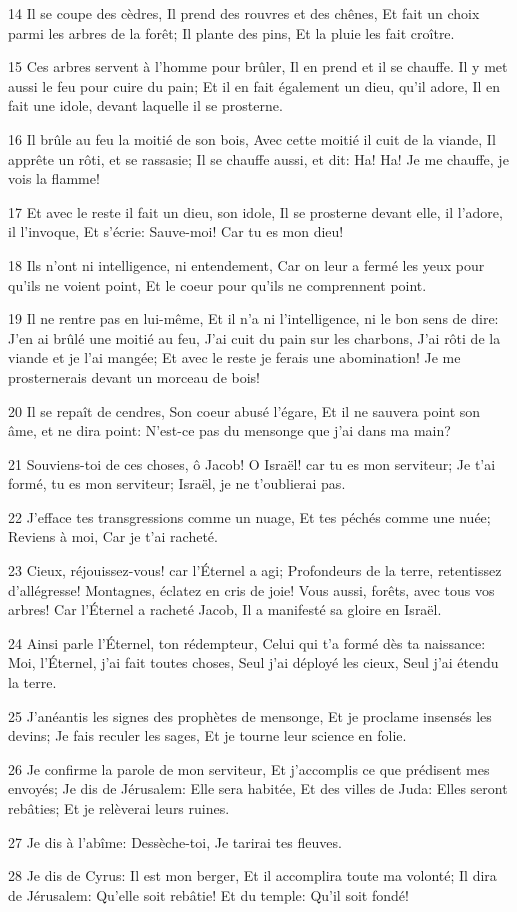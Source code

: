 \par 14 Il se coupe des cèdres, Il prend des rouvres et des chênes, Et fait un choix parmi les arbres de la forêt; Il plante des pins, Et la pluie les fait croître.
\par 15 Ces arbres servent à l'homme pour brûler, Il en prend et il se chauffe. Il y met aussi le feu pour cuire du pain; Et il en fait également un dieu, qu'il adore, Il en fait une idole, devant laquelle il se prosterne.
\par 16 Il brûle au feu la moitié de son bois, Avec cette moitié il cuit de la viande, Il apprête un rôti, et se rassasie; Il se chauffe aussi, et dit: Ha! Ha! Je me chauffe, je vois la flamme!
\par 17 Et avec le reste il fait un dieu, son idole, Il se prosterne devant elle, il l'adore, il l'invoque, Et s'écrie: Sauve-moi! Car tu es mon dieu!
\par 18 Ils n'ont ni intelligence, ni entendement, Car on leur a fermé les yeux pour qu'ils ne voient point, Et le coeur pour qu'ils ne comprennent point.
\par 19 Il ne rentre pas en lui-même, Et il n'a ni l'intelligence, ni le bon sens de dire: J'en ai brûlé une moitié au feu, J'ai cuit du pain sur les charbons, J'ai rôti de la viande et je l'ai mangée; Et avec le reste je ferais une abomination! Je me prosternerais devant un morceau de bois!
\par 20 Il se repaît de cendres, Son coeur abusé l'égare, Et il ne sauvera point son âme, et ne dira point: N'est-ce pas du mensonge que j'ai dans ma main?
\par 21 Souviens-toi de ces choses, ô Jacob! O Israël! car tu es mon serviteur; Je t'ai formé, tu es mon serviteur; Israël, je ne t'oublierai pas.
\par 22 J'efface tes transgressions comme un nuage, Et tes péchés comme une nuée; Reviens à moi, Car je t'ai racheté.
\par 23 Cieux, réjouissez-vous! car l'Éternel a agi; Profondeurs de la terre, retentissez d'allégresse! Montagnes, éclatez en cris de joie! Vous aussi, forêts, avec tous vos arbres! Car l'Éternel a racheté Jacob, Il a manifesté sa gloire en Israël.
\par 24 Ainsi parle l'Éternel, ton rédempteur, Celui qui t'a formé dès ta naissance: Moi, l'Éternel, j'ai fait toutes choses, Seul j'ai déployé les cieux, Seul j'ai étendu la terre.
\par 25 J'anéantis les signes des prophètes de mensonge, Et je proclame insensés les devins; Je fais reculer les sages, Et je tourne leur science en folie.
\par 26 Je confirme la parole de mon serviteur, Et j'accomplis ce que prédisent mes envoyés; Je dis de Jérusalem: Elle sera habitée, Et des villes de Juda: Elles seront rebâties; Et je relèverai leurs ruines.
\par 27 Je dis à l'abîme: Dessèche-toi, Je tarirai tes fleuves.
\par 28 Je dis de Cyrus: Il est mon berger, Et il accomplira toute ma volonté; Il dira de Jérusalem: Qu'elle soit rebâtie! Et du temple: Qu'il soit fondé!

